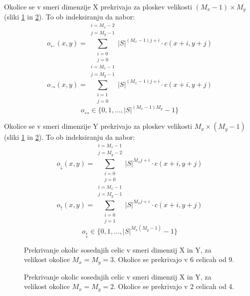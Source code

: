 \documentclass[12pt,a4paper,openany,twoside]{book}
\begin{document}
Okolice se v smeri dimenzije X prekrivajo za ploskev velikosti \((M_x-1) \times M_y\) (sliki \ref{overlap_dimension_moore} in \ref{overlap_dimension_quad}).
To ob indeksiranju da nabor:
\begin{equation}
o_{\leftarrow}(x,y) = \sum_{\substack{i=0 \\ j=0}}^{\substack{i=M_x-2 \\ j=M_y-1}} |S|^{(M_x-1) j + i} \cdot c(x+i,y+j)
\end{equation}
\begin{equation}
o_{\rightarrow}(x,y) = \sum_{\substack{i=1 \\ j=0}}^{\substack{i=M_x-1 \\ j=M_y-1}} |S|^{(M_x-1) j + i} \cdot c(x+i,y+j)
\end{equation}
\begin{equation}
o_{\leftrightarrow} \in \{0, 1, \ldots, |S|^{(M_x-1)M_y}-1\}
\end{equation}

Okolice se v smeri dimenzije Y prekrivajo za ploskev velikosti \(M_x \times (M_y-1)\) (sliki \ref{overlap_dimension_moore} in \ref{overlap_dimension_quad}).
To ob indeksiranju da nabor:
\begin{equation}
o_{\downarrow}(x,y) = \sum_{\substack{i=0 \\ j=0}}^{\substack{i=M_x-1 \\ j=M_y-2}} |S|^{M_x j + i} \cdot c(x+i,y+j)
\end{equation}
\begin{equation}
o_{\uparrow}(x,y) = \sum_{\substack{i=0 \\ j=1}}^{\substack{i=M_x-1 \\ j=M_y-1}} |S|^{M_x j + i} \cdot c(x+i,y+j)
\end{equation}
\begin{equation}
o_{\updownarrow} \in \{0, 1, \ldots, |S|^{M_x(M_y-1)}-1\}
\end{equation}

\vspace{5mm}
\begin{figure}[htb]
\centerline{}
\caption[Prekrivaje okolic \(3 \times 3\) v smeri dimenzij X in Y.]
{Prekrivanje okolic sosednjih celic v smeri dimenzij X in Y, za velikost okolice \(M_x=M_y=3\).
Okolice se prekrivajo v 6 celicah od 9.}
\label{overlap_dimension_moore}
\end{figure}

\vspace{5mm}
\begin{figure}[htb]
\centerline{}
\caption[Prekrivaje okolic \(2 \times 2\) v smeri dimenzij X in Y.]
{Prekrivanje okolic sosednjih celic v smeri dimenzij X in Y, za velikost okolice \(M_x=M_y=2\).
Okolice se prekrivajo v 2 celicah od 4.}
\label{overlap_dimension_quad}
\end{figure}
\end{document}
